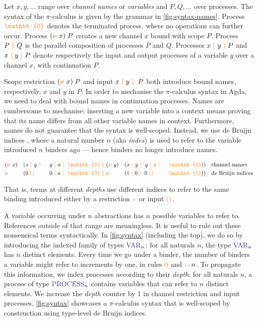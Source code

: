 \documentclass[a4paper,UKenglish,cleveref,autoref,thm-restate,authorcolumns]{lipics-v2019}
\theoremstyle{definition}
\newcommand{\picalc}{$\pi$-calculus}
\newcommand{\type}[1]{\textcolor{BlueViolet}{\operatorname{#1}}}
\newcommand{\constr}[1]{\textcolor{BurntOrange}{\operatorname{#1}}}
\newcommand{\PO}{\constr{\mathbb{0}}}
\newcommand{\comp}[2]{#1 \; \constr{\parallel} \; #2}
\newcommand{\new}{\constr{\boldsymbol{\nu}} \;}
\newcommand{\send}[2]{#1 \; \constr{\langle} \; #2 \;\constr{\rangle} \;}
\newcommand{\sendp}[2]{#1 \; \constr{\langle} \; #2 \; \constr{\rangle} \;}
\newcommand{\recv}[1]{#1 \; \constr{\mathbb{()}} \;}
\newcommand{\recvp}[2]{#1 \; \constr{(} \; #2 \; \constr{)} \;}
\newcommand{\suc}{\constr{\scriptstyle 1+}}
\newcommand{\Var}{\type{VAR}}
\newcommand{\Process}{\type{PROCESS}}
\begin{document}
Let $x, y,\ldots$ range over \emph{channel names} or \emph{variables} and $P, Q,\ldots$ over processes.
The syntax of the \picalc{} \cite{Sangio01} is given by the grammar in \autoref{fig:syntax-names}.
Process $\PO$ denotes the terminated process, where no operations can further occur.
Process $(\new{}x)\; P$ creates a new channel $x$ bound with scope $P$.
Process $\comp{P}{Q}$ is the parallel composition of processes $P$ and $Q$.
Processes $\recvp{x}{y} P$ and $\sendp{x}{y} P$ denote respectively the input and output processes of a variable $y$ over a channel $x$, with continuation $P$.

Scope restriction $(\new{}x) \; P$ and input $\recvp{x}{y} \; P$ both introduce bound names, respectively, $x$ and $y$ in $P$.
In order to mechanise the \picalc{} syntax in Agda, we need to deal with bound names in continuation processes.
Names are cumbersome to mechanise: inserting a new variable into a context means proving that its name differs from all other variable names in context.
Furthermore, names do not guarantee that the syntax is well-scoped.
Instead, we use de Bruijn indices \cite{deBruijn1972}, where a natural number $n$ (aka \emph{index}) is used to refer to the variable introduced $n$ binders ago --- hence binders no longer introduce names.
\begin{example}
  \begin{equation*}
    \begin{split}
      & (\new{}x ) && (\comp {\recvp{x}{y} && \; \sendp{y}{a} \; \PO} {(\new{} y) && (\sendp{x}{y} \; \recvp{y}{z} && \; \PO)})
      && \text{channel names}
      \\
      & \new{} && (\comp {\recv{0} && \; \send{0}{a} \; \PO} {\new{} && (\send{1}{0} \; \recv{0} && \; \PO)})
      && \text{de Bruijn indices}
      \\
    \end{split}
  \end{equation*}
\end{example}
That is, terms at different \emph{depths} use different indices to refer to the same binding introduced either by a restriction $\constr{\nu}$ or input $\constr{()}$.

A variable occurring under $n$ abstractions has $n$ possible variables to refer to.
References outside of that range are meaningless.
It is useful to rule out these nonsensical terms syntactically.
In \autoref{fig:syntax} (including the top), we do so by introducing the indexed family of types $\Var_n$: for all naturals $n$, the type $\Var_n$ has $n$ distinct elements.
Every time we go under a binder, the number of binders a variable might refer to increments by one, in rules $\constr{0}$ and $\suc n$. 
To propagate this information, we index processes according to their \emph{depth}: for all naturals $n$, a process of type $\Process_n$ contains variables that can refer to $n$ distinct elements.
We increase the \emph{depth} counter by 1 in channel restriction and input processes.
\autoref{fig:syntax} showcases a \picalc{} syntax that is well-scoped by construction using type-level de Bruijn indices.
\end{document}
